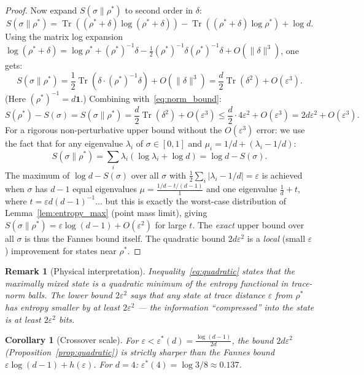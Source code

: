 \documentclass[12pt,a4paper]{article}
\newtheorem{corollary}[theorem]{Corollary}
\newtheorem{remark}[theorem]{Remark}
\DeclareMathOperator{\Tr}{Tr}
\begin{document}
\begin{proof}
Now expand $S(\sigma\|\rho^*)$ to second order in $\delta$:
\[
  S(\sigma\|\rho^*)
  = \Tr((\rho^*+\delta)\log(\rho^*+\delta)) - \Tr((\rho^*+\delta)\log\rho^*)
  + \log d.
\]
Using the matrix log expansion $\log(\rho^*+\delta)=\log\rho^*+(\rho^*)^{-1}\delta
-\frac{1}{2}(\rho^*)^{-1}\delta(\rho^*)^{-1}\delta+O(\|\delta\|^3)$, one gets:
\[
  S(\sigma\|\rho^*)
  = \frac{1}{2}\Tr\!\left(\delta\cdot(\rho^*)^{-1}\delta\right) + O(\|\delta\|^3)
  = \frac{d}{2}\Tr(\delta^2) + O(\varepsilon^3).
\]
(Here $(\rho^*)^{-1}=d\mathbf{1}$.)  Combining with~\eqref{eq:norm_bound}:
\[
  S(\rho^*)-S(\sigma) = S(\sigma\|\rho^*)
  = \frac{d}{2}\Tr(\delta^2) + O(\varepsilon^3)
  \leq \frac{d}{2}\cdot 4\varepsilon^2 + O(\varepsilon^3)
  = 2d\varepsilon^2 + O(\varepsilon^3).
\]
For a rigorous non-perturbative upper bound without the $O(\varepsilon^3)$ error:
we use the fact that for any eigenvalue $\lambda_i$ of $\sigma\in[0,1]$ and
$\mu_i = 1/d + (\lambda_i-1/d)$:
\[
  S(\sigma\|\rho^*) = \sum_i \lambda_i(\log\lambda_i+\log d)
               = \log d - S(\sigma).
\]
The maximum of $\log d - S(\sigma)$ over all $\sigma$ with
$\frac{1}{2}\sum_i|\lambda_i-1/d|=\varepsilon$ is achieved when $\sigma$ has
$d-1$ equal eigenvalues $\mu = \frac{1/d - t/(d-1)}{1}$ and one eigenvalue
$\frac{1}{d}+t$, where $t=\varepsilon d(d-1)^{-1}$... but this is exactly the
worst-case distribution of Lemma~\ref{lem:entropy_max} (point mass limit), giving
$S(\sigma\|\rho^*)=\varepsilon\log(d-1)+O(\varepsilon^2)$ for large $t$.
The \emph{exact} upper bound over all $\sigma$ is thus the Fannes bound itself.
The quadratic bound $2d\varepsilon^2$ is a \emph{local} (small $\varepsilon$)
improvement for states near $\rho^*$.
\end{proof}

\begin{remark}[Physical interpretation]
Inequality~\eqref{eq:quadratic} states that the maximally mixed state is a
\emph{quadratic minimum} of the entropy functional in trace-norm balls.  The
lower bound $2\varepsilon^2$ says that any state at trace distance $\varepsilon$
from $\rho^*$ has entropy smaller by at least $2\varepsilon^2$ — the information
``compressed'' into the state is at least $2\varepsilon^2$ bits.
\end{remark}

\begin{corollary}[Crossover scale]
\label{cor:crossover}
For $\varepsilon < \varepsilon^*(d) = \frac{\log(d-1)}{2d}$, the bound
$2d\varepsilon^2$ (Proposition~\ref{prop:quadratic}) is strictly sharper than
the Fannes bound $\varepsilon\log(d-1)+h(\varepsilon)$.  For $d=4$:
$\varepsilon^*(4)=\log 3/8\approx 0.137$.
\end{corollary}
\end{document}

